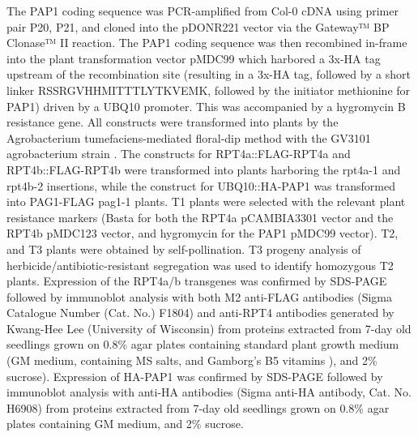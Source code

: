 	The PAP1 coding sequence was PCR-amplified from Col-0 cDNA using primer pair P20, P21, and cloned into the pDONR221 vector via the Gateway™ BP Clonase™ II reaction. The PAP1 coding sequence was then recombined in-frame into the plant transformation vector pMDC99 which harbored a 3x-HA tag upstream of the recombination site (resulting in a 3x-HA tag, followed by a short linker RSSRGVHHMITTTLYTKVEMK, followed by the initiator methionine for PAP1) driven by a UBQ10 promoter. This was accompanied by a hygromycin B resistance gene. All constructs were transformed into plants by the Agrobacterium tumefaciens-mediated floral-dip method with the GV3101 agrobacterium strain \citep{gelvin03, zhang06}. The constructs for RPT4a::FLAG-RPT4a and RPT4b::FLAG-RPT4b were transformed into plants harboring the rpt4a-1 and rpt4b-2 insertions, while the construct for UBQ10::HA-PAP1 was transformed into PAG1-FLAG pag1-1 plants. T1 plants were selected with the relevant plant resistance markers (Basta for both the RPT4a pCAMBIA3301 vector and the RPT4b pMDC123 vector, and hygromycin for the PAP1 pMDC99 vector). T2, and T3 plants were obtained by self-pollination. T3 progeny analysis of herbicide/antibiotic-resistant segregation was used to identify homozygous T2 plants. Expression of the RPT4a/b transgenes was confirmed by SDS-PAGE followed by immunoblot analysis with both M2 anti-FLAG antibodies (Sigma Catalogue Number (Cat. No.) F1804) and anti-RPT4 antibodies generated by Kwang-Hee Lee (University of Wisconsin) from proteins extracted from 7-day old seedlings grown on 0.8\% agar plates containing standard plant growth medium (GM medium, containing MS salts, and Gamborg’s B5 vitamins \citep{gamborg68, julio06, murashige62}), and 2\% sucrose). Expression of HA-PAP1 was confirmed by SDS-PAGE followed by immunoblot analysis with anti-HA antibodies (Sigma anti-HA antibody, Cat. No. H6908) from proteins extracted from 7-day old seedlings grown on 0.8\% agar plates containing GM medium, and 2\% sucrose.

